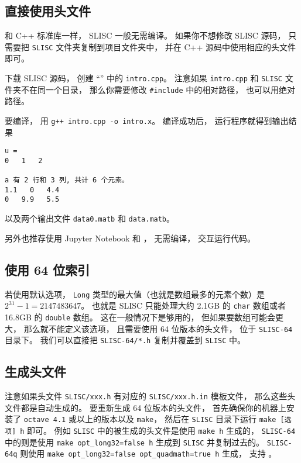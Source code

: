 
\begin{issues}
\issueDraft
\end{issues}


\subsection{直接使用头文件}
和 C++ 标准库一样， SLISC 一般无需编译。 如果你不想修改 SLISC 源码， 只需要把 \verb`SLISC` 文件夹复制到项目文件夹中， 并在 C++ 源码中使用相应的头文件即可。

下载 SLISC 源码， 创建 “” 中的 \verb`intro.cpp`。 注意如果 \verb`intro.cpp` 和 \verb`SLISC` 文件夹不在同一个目录， 那么你需要修改 \verb`#include` 中的相对路径， 也可以用绝对路径。

要编译， 用 \verb`g++ intro.cpp -o intro.x`。 编译成功后， 运行程序就得到输出结果
\begin{lstlisting}[language=none]
u = 
0   1   2   

a 有 2 行和 3 列, 共计 6 个元素。
1.1   0   4.4   
0   9.9   5.5
\end{lstlisting}
以及两个输出文件 \verb`data0.matb` 和 \verb`data.matb`。

另外也推荐使用 Jupyter Notebook 和 ， 无需编译， 交互运行代码。

\subsection{使用 64 位索引}
若使用默认选项， \verb`Long` 类型的最大值（也就是数组最多的元素个数）是 $2^{31}-1 = 2147483647$。 也就是 SLISC 只能处理大约 2.1GB 的 \verb`char` 数组或者 16.8GB 的 \verb`double` 数组。 这在一般情况下是够用的， 但如果要数组可能会更大， 那么就不能定义该选项， 且需要使用 64 位版本的头文件， 位于 \verb`SLISC-64` 目录下。 我们可以直接把 \verb`SLISC-64/*.h` 复制并覆盖到 \verb`SLISC` 中。

\subsection{生成头文件}

注意如果头文件 \verb`SLISC/xxx.h` 有对应的 \verb`SLISC/xxx.h.in` 模板文件， 那么这些头文件都是自动生成的。 要重新生成 64 位版本的头文件， 首先确保你的机器上安装了 \verb`octave 4.1` 或以上的版本以及 \verb`make`， 然后在 \verb`SLISC` 目录下运行 \verb`make [选项] h` 即可。 例如 \verb`SLISC` 中的被生成的头文件是使用 \verb`make h` 生成的， \verb`SLISC-64` 中的则是使用 \verb`make opt_long32=false h` 生成到 \verb`SLISC` 并复制过去的。 \verb`SLISC-64q` 则使用 \verb`make opt_long32=false opt_quadmath=true h` 生成， 支持 。

